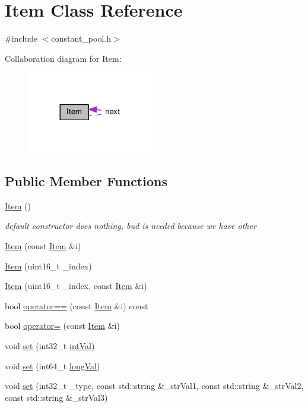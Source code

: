 \hypertarget{classItem}{\section{Item Class Reference}
\label{classItem}
}


{\ttfamily \#include $<$constant\-\_\-pool.\-h$>$}



Collaboration diagram for Item\-:
\nopagebreak
\begin{figure}[H]
\begin{center}
\leavevmode
\includegraphics[width=156pt]{classItem__coll__graph}
\end{center}
\end{figure}
\subsection*{Public Member Functions}
\begin{DoxyCompactItemize}
\item 
\hyperlink{classItem_a297720c02984eab37332ae795d22189d}{Item} ()
\begin{DoxyCompactList}\small\item\em default constructor does nothing, bud is needed because we have other \end{DoxyCompactList}\item 
\hyperlink{classItem_ade7e491f0f1fb579f98c28f7079ace05}{Item} (const \hyperlink{classItem}{Item} \&i)
\item 
\hyperlink{classItem_a67f7e880e22f809d8d79cf506f5b2cda}{Item} (uint16\-\_\-t \-\_\-index)
\item 
\hyperlink{classItem_ac10ca71346b926c98fd3084009d59631}{Item} (uint16\-\_\-t \-\_\-index, const \hyperlink{classItem}{Item} \&i)
\item 
bool \hyperlink{classItem_a84846489b45c30f17e16a2dc2b67b3ce}{operator==} (const \hyperlink{classItem}{Item} \&i) const 
\item 
bool \hyperlink{classItem_a007f803456c6eb508b58539546181722}{operator=} (const \hyperlink{classItem}{Item} \&i)
\item 
void \hyperlink{classItem_a6c9c2df6f8e7e5bd6816cbbb9d50bf1e}{set} (int32\-\_\-t \hyperlink{classItem_a37e64449e06749eded7f699b13f8ede7}{int\-Val})
\item 
void \hyperlink{classItem_a778afe86a8bae9e56686e153b4550460}{set} (int64\-\_\-t \hyperlink{classItem_aaaa7f2c4f4a2163862b1508202ecf038}{long\-Val})
\item 
void \hyperlink{classItem_a0a4eb862c72e765ee779e3c461bfdcc0}{set} (int32\-\_\-t \-\_\-type, const std\-::string \&\-\_\-str\-Val1, const std\-::string \&\-\_\-str\-Val2, const std\-::string \&\-\_\-str\-Val3)
\end{DoxyCompactItemize}
